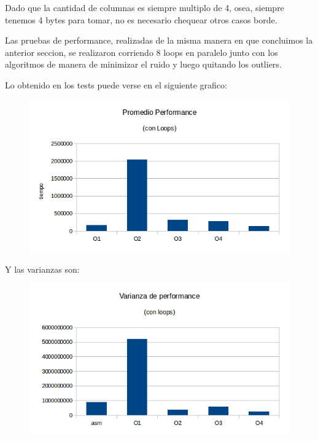 \documentclass[a4paper]{article}
\begin{document}
Dado que la cantidad de columnas es siempre multiplo de 4, osea, siempre tenemos 4 bytes para tomar, no es necesario chequear otros casos borde.

Las pruebas de performance, realizadas de la misma manera en que concluimos la anterior seccion, se realizaron corriendo 8 loops en paralelo junto con los algoritmos de manera de minimizar el ruido y luego quitando los outliers.

Lo obtenido en los tests puede verse en el siguiente grafico:

\begin{figure}[h!]
  \begin{center}
	\includegraphics[scale=0.66]{Graficos1.4/crop/PSO.png}
	\label{nombreparareferenciar5}
  \end{center}
\end{figure}

\newpage
Y las varianzas son:

\begin{figure}[h!]
  \begin{center}
	\includegraphics[scale=0.66]{Graficos1.4/crop/VSO.png}
	\label{nombreparareferenciar6}
  \end{center}
\end{figure}
\end{document}
